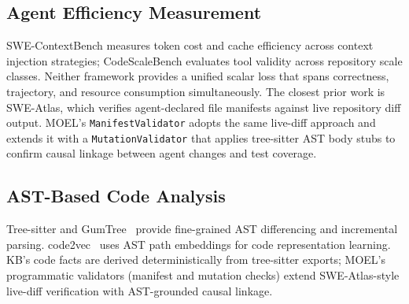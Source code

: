 \subsection{Agent Efficiency Measurement}

SWE-ContextBench measures token cost and cache efficiency across context
injection strategies; CodeScaleBench evaluates tool validity across repository
scale classes.  Neither framework provides a unified scalar loss that spans
correctness, trajectory, and resource consumption simultaneously.  The closest
prior work is SWE-Atlas, which verifies agent-declared file manifests against
live repository diff output.  MOEL's \texttt{ManifestValidator} adopts the
same live-diff approach and extends it with a \texttt{MutationValidator} that
applies tree-sitter AST body stubs to confirm causal linkage between agent
changes and test coverage.

\subsection{AST-Based Code Analysis}

Tree-sitter and GumTree~\cite{falleri2014gumtree} provide fine-grained
AST differencing and incremental parsing.  code2vec~\cite{alon2019code2vec} uses AST path embeddings for
code representation learning.  KB's code facts are derived deterministically from
tree-sitter exports; MOEL's programmatic validators (manifest and mutation checks)
extend SWE-Atlas-style live-diff verification with AST-grounded causal linkage.
